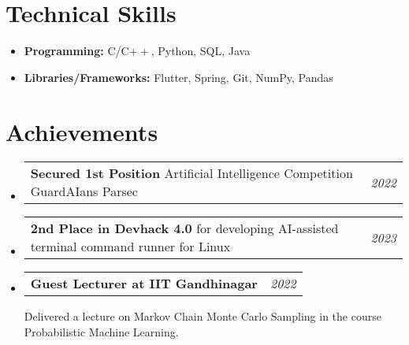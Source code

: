 \documentclass[a4paper,11pt]{article}
\makeatletter
\newcommand{\resumeItem}[2]{
  \item{
    \textbf{#1}{\hspace{0.5mm}#2 \vspace{-0.5mm}}
  }
}
\newcommand{\resumePOR}[3]{
\vspace{0.5mm}\item
    \begin{tabular*}{0.97\textwidth}[t]{l@{\extracolsep{\fill}}r}
        \textbf{#1}\hspace{0.3mm}#2 & \textit{\small{#3}} 
    \end{tabular*}
    \vspace{-2mm}
}
\newcommand{\github}[1]{%
   \href{#1}{\faGithub}%
}
\newcommand{\resumeSubItem}[2]{\resumeItem{#1}{#2}\vspace{-4pt}}
\newcommand{\resumeSubHeadingListStart}{\begin{itemize}[leftmargin=*,labelsep=0mm,label={}]}
\newcommand{\resumeHeadingSkillStart}{\begin{itemize}[leftmargin=*,itemsep=1.7mm, rightmargin=2ex]}
\newcommand{\resumeSubHeadingListEnd}{\end{itemize}\vspace{2mm}}
\newcommand{\resumeHeadingSkillEnd}{\end{itemize}\vspace{-2mm}}
\makeatother
\begin{document}
\section{Technical Skills}
 \resumeHeadingSkillStart
  \resumeSubItem{Programming: } %
    { C/C$++$, Python, SQL, Java}
 \resumeSubItem{Libraries/Frameworks: } %
    { Flutter, Spring, Git, NumPy, Pandas}
    
 \resumeHeadingSkillEnd




\section{Achievements}
\vspace{-0.4mm}
\resumeSubHeadingListStart
\resumePOR{Secured 1st Position } %
    {Artificial Intelligence Competition GuardAIans Parsec } %
    {2022} %
\resumePOR{2nd Place in Devhack 4.0} { for developing AI-assisted terminal command runner for Linux \github{https://github.com/Arvind-kumar-M-08/intellish}} %
    {2023} %

\resumePOR{Guest Lecturer at IIT Gandhinagar } %
    { } %
    {2022} %
    
\hspace{2mm}Delivered a lecture on Markov Chain Monte Carlo Sampling in the course Probabilistic Machine Learning.
\resumeSubHeadingListEnd
\vspace{-5mm}


\end{document}
